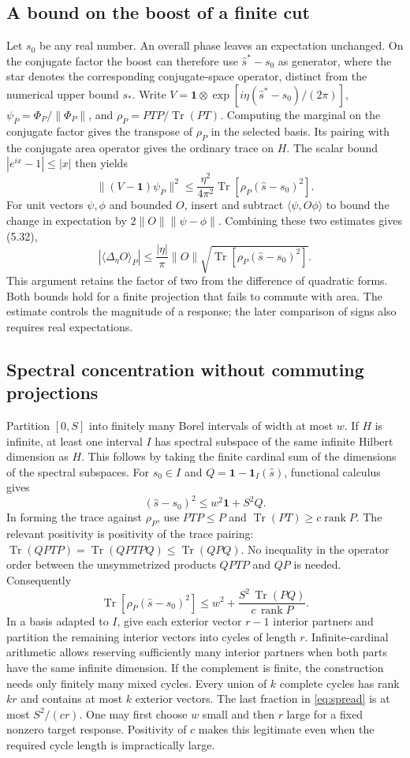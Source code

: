 \documentclass[11pt]{article}
\newcommand{\Tr}{\operatorname{Tr}}
\newcommand{\id}{\mathbf{1}}
\newcommand{\areaop}{\hat s}
\DeclareMathOperator{\rank}{rank}
\begin{document}
\subsection{A bound on the boost of a finite cut}
Let $s_0$ be any real number. An overall phase leaves an expectation unchanged. On the conjugate factor the boost can therefore use $\areaop^*-s_0$ as generator, where the star denotes the corresponding conjugate-space operator, distinct from the numerical upper bound $s_*$. Write $V=\id\otimes\exp[i\eta(\areaop^*-s_0)/(2\pi)]$, $\psi_P=\Phi_P/\|\Phi_P\|$, and $\rho_P=PTP/\Tr(PT)$. Computing the marginal on the conjugate factor gives the transpose of $\rho_P$ in the selected basis. Its pairing with the conjugate area operator gives the ordinary trace on $H$. The scalar bound $|e^{ix}-1|\le|x|$ then yields
\[
 \|(V-\id)\psi_P\|^2
 \le \frac{\eta^2}{4\pi^2}\Tr[\rho_P(\areaop-s_0)^2].
\]
For unit vectors $\psi,\phi$ and bounded $O$, insert and subtract $\langle\psi,O\phi\rangle$ to bound the change in expectation by $2\|O\|\|\psi-\phi\|$. Combining these two estimates gives (5.32),
\[
 |\langle\Delta_\eta O\rangle_P|
 \le \frac{|\eta|}{\pi}\|O\|\sqrt{\Tr[\rho_P(\areaop-s_0)^2]} .
\]
This argument retains the factor of two from the difference of quadratic forms. Both bounds hold for a finite projection that fails to commute with area. The estimate controls the magnitude of a response; the later comparison of signs also requires real expectations.

\subsection{Spectral concentration without commuting projections}
Partition $[0,S]$ into finitely many Borel intervals of width at most $w$. If $H$ is infinite, at least one interval $I$ has spectral subspace of the same infinite Hilbert dimension as $H$. This follows by taking the finite cardinal sum of the dimensions of the spectral subspaces. For $s_0\in I$ and $Q=\id-\id_I(\areaop)$, functional calculus gives
\[
 (\areaop-s_0)^2\le w^2\id+S^2 Q .
\]
In forming the trace against $\rho_P$, use $PTP\le P$ and $\Tr(PT)\ge c\rank P$. The relevant positivity is positivity of the trace pairing: $\Tr(QPTP)=\Tr(QPTPQ)\le\Tr(QPQ)$. No inequality in the operator order between the unsymmetrized products $QPTP$ and $QP$ is needed. Consequently
\begin{equation}\label{eq:spread}
 \Tr[\rho_P(\areaop-s_0)^2]\le
 w^2+\frac{S^2\,\Tr(PQ)}{c\,\rank P}.
\end{equation}
In a basis adapted to $I$, give each exterior vector $r-1$ interior partners and partition the remaining interior vectors into cycles of length $r$. Infinite-cardinal arithmetic allows reserving sufficiently many interior partners when both parts have the same infinite dimension. If the complement is finite, the construction needs only finitely many mixed cycles. Every union of $k$ complete cycles has rank $kr$ and contains at most $k$ exterior vectors. The last fraction in \eqref{eq:spread} is at most $S^2/(cr)$. One may first choose $w$ small and then $r$ large for a fixed nonzero target response. Positivity of $c$ makes this legitimate even when the required cycle length is impractically large.
\end{document}
